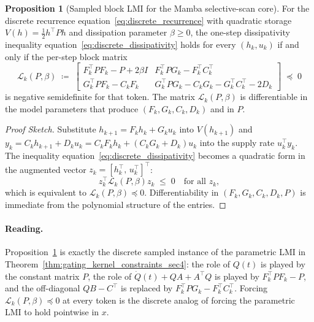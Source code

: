 \documentclass[10pt]{article} %
\def\eqref#1{equation~\ref{#1}}
\theoremstyle{definition}
\newtheorem{proposition}[theorem]{Proposition}
\begin{document}
\begin{proposition}[Sampled block LMI for the Mamba selective-scan core]
\label{prop:sampled_lmi}
For the discrete recurrence \eqref{eq:discrete_recurrence} with quadratic storage $V(h)=\tfrac12 h^\top P h$ and dissipation parameter $\beta\ge 0$, the one-step dissipativity inequality \eqref{eq:discrete_dissipativity} holds for every $(h_k,u_k)$ if and only if the per-step block matrix
\begin{equation}
\label{eq:sampled_lmi}
\mathcal{L}_k(P,\beta) \;\coloneqq\;
\begin{bmatrix}
F_k^\top P F_k - P + 2\beta I & F_k^\top P G_k - F_k^\top C_k^\top \\[2pt]
G_k^\top P F_k - C_k F_k & G_k^\top P G_k - C_k G_k - G_k^\top C_k^\top - 2 D_k
\end{bmatrix}
\;\preceq\; 0
\end{equation}
is negative semidefinite for that token. The matrix $\mathcal{L}_k(P,\beta)$ is differentiable in the model parameters that produce $(F_k,G_k,C_k,D_k)$ and in $P$.
\end{proposition}

\begin{proof}[Proof Sketch]
Substitute $h_{k+1}=F_k h_k + G_k u_k$ into $V(h_{k+1})$ and $y_k = C_k h_{k+1} + D_k u_k = C_k F_k h_k + (C_k G_k + D_k) u_k$ into the supply rate $u_k^\top y_k$. The inequality \eqref{eq:discrete_dissipativity} becomes a quadratic form in the augmented vector $z_k = [h_k^\top,\, u_k^\top]^\top$:
\[
z_k^\top \mathcal{L}_k(P,\beta) z_k \;\le\; 0 \quad \text{for all } z_k,
\]
which is equivalent to $\mathcal{L}_k(P,\beta)\preceq 0$. Differentiability in $(F_k,G_k,C_k,D_k,P)$ is immediate from the polynomial structure of the entries.
\end{proof}

\paragraph{Reading.} Proposition~\ref{prop:sampled_lmi} is exactly the discrete sampled instance of the parametric LMI in Theorem~\ref{thm:gating_kernel_constraints_sec4}: the role of $Q(t)$ is played by the constant matrix $P$, the role of $\dot Q(t)+QA+A^\top Q$ is played by $F_k^\top P F_k - P$, and the off-diagonal $QB-C^\top$ is replaced by $F_k^\top P G_k - F_k^\top C_k^\top$. Forcing $\mathcal{L}_k(P,\beta)\preceq 0$ at every token is the discrete analog of forcing the parametric LMI to hold pointwise in $x$.
\end{document}
